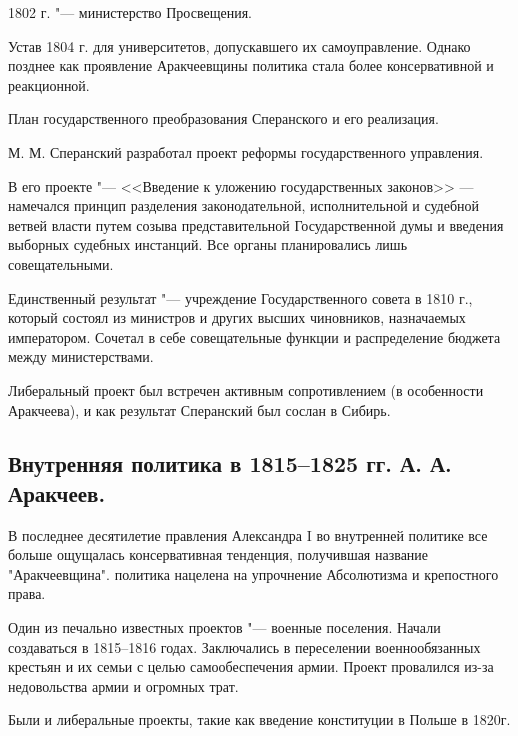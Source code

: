 1802 г. "--- министерство Просвещения.

Устав 1804 г. для университетов, допускавшего их самоуправление. Однако позднее как проявление Аракчеевщины политика стала более консервативной и реакционной.

План государственного преобразования Сперанского и его реализация.

М. М. Сперанский разработал проект реформы государственного управления.

В его проекте "--- <<Введение к уложению государственных законов>> — намечался принцип разделения законодательной, исполнительной и судебной ветвей власти путем созыва представительной Государственной думы и введения выборных судебных инстанций. Все органы планировались лишь совещательными.

Единственный результат "--- учреждение Государственного совета в 1810 г., который состоял из министров и других высших чиновников, назначаемых императором. Сочетал в себе совещательные функции  и  распределение бюджета между министерствами.

Либеральный проект был встречен активным сопротивлением (в особенности Аракчеева), и как результат Сперанский был сослан в Сибирь.

\subsection{Внутренняя политика в 1815--1825 гг. А. А. Аракчеев.}

В последнее десятилетие правления Александра I во внутренней политике все больше ощущалась консервативная тенденция, получившая название "Аракчеевщина". политика нацелена на упрочнение Абсолютизма и крепостного права.

Один из печально известных проектов "--- военные поселения. Начали создаваться в 1815--1816 годах. Заключались в переселении военнообязанных крестьян и их семьи с целью самообеспечения армии. Проект провалился из-за недовольства армии и огромных трат.

Были и либеральные проекты, такие как введение конституции в Польше в 1820г.
